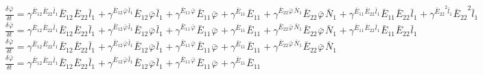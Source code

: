$\frac{{\delta}^{} {\bar{\varphi}}_{}}{{\delta} {{{t}}_{}}^{}} = {\gamma}^{{{{\bar{E}}_{12}}^{}{{\bar{E}}_{22}}^{}{{\bar{l}}_{1}}^{}}}{{{\bar{E}}_{12}}^{}{{\bar{E}}_{22}}^{}{{\bar{l}}_{1}}^{}} + {\gamma}^{{{{\bar{E}}_{12}}^{}{{\bar{\varphi}}_{}}^{}{{\bar{l}}_{1}}^{}}}{{{\bar{E}}_{12}}^{}{{\bar{\varphi}}_{}}^{}{{\bar{l}}_{1}}^{}} + {\gamma}^{{{{\bar{E}}_{11}}^{}{{\bar{\varphi}}_{}}^{}}}{{{\bar{E}}_{11}}^{}{{\bar{\varphi}}_{}}^{}} + {\gamma}^{{{{\bar{E}}_{11}}^{}}}{{{\bar{E}}_{11}}^{}} + {\gamma}^{{{{\bar{E}}_{22}}^{}{{\bar{\varphi}}_{}}^{}{{\bar{N}}_{1}}^{}}}{{{\bar{E}}_{22}}^{}{{\bar{\varphi}}_{}}^{}{{\bar{N}}_{1}}^{}} + {\gamma}^{{{{\bar{E}}_{11}}^{}{{\bar{E}}_{22}}^{}{{\bar{l}}_{1}}^{}}}{{{\bar{E}}_{11}}^{}{{\bar{E}}_{22}}^{}{{\bar{l}}_{1}}^{}} + {\gamma}^{{{{\bar{E}}_{22}}^{2}{{\bar{l}}_{1}}^{}}}{{{\bar{E}}_{22}}^{2}{{\bar{l}}_{1}}^{}}$
$\frac{{\delta}^{} {\bar{\varphi}}_{}}{{\delta} {{{t}}_{}}^{}} = {\gamma}^{{{{\bar{E}}_{12}}^{}{{\bar{E}}_{22}}^{}{{\bar{l}}_{1}}^{}}}{{{\bar{E}}_{12}}^{}{{\bar{E}}_{22}}^{}{{\bar{l}}_{1}}^{}} + {\gamma}^{{{{\bar{E}}_{12}}^{}{{\bar{\varphi}}_{}}^{}{{\bar{l}}_{1}}^{}}}{{{\bar{E}}_{12}}^{}{{\bar{\varphi}}_{}}^{}{{\bar{l}}_{1}}^{}} + {\gamma}^{{{{\bar{E}}_{11}}^{}{{\bar{\varphi}}_{}}^{}}}{{{\bar{E}}_{11}}^{}{{\bar{\varphi}}_{}}^{}} + {\gamma}^{{{{\bar{E}}_{11}}^{}}}{{{\bar{E}}_{11}}^{}} + {\gamma}^{{{{\bar{E}}_{22}}^{}{{\bar{\varphi}}_{}}^{}{{\bar{N}}_{1}}^{}}}{{{\bar{E}}_{22}}^{}{{\bar{\varphi}}_{}}^{}{{\bar{N}}_{1}}^{}} + {\gamma}^{{{{\bar{E}}_{11}}^{}{{\bar{E}}_{22}}^{}{{\bar{l}}_{1}}^{}}}{{{\bar{E}}_{11}}^{}{{\bar{E}}_{22}}^{}{{\bar{l}}_{1}}^{}}$
$\frac{{\delta}^{} {\bar{\varphi}}_{}}{{\delta} {{{t}}_{}}^{}} = {\gamma}^{{{{\bar{E}}_{12}}^{}{{\bar{E}}_{22}}^{}{{\bar{l}}_{1}}^{}}}{{{\bar{E}}_{12}}^{}{{\bar{E}}_{22}}^{}{{\bar{l}}_{1}}^{}} + {\gamma}^{{{{\bar{E}}_{12}}^{}{{\bar{\varphi}}_{}}^{}{{\bar{l}}_{1}}^{}}}{{{\bar{E}}_{12}}^{}{{\bar{\varphi}}_{}}^{}{{\bar{l}}_{1}}^{}} + {\gamma}^{{{{\bar{E}}_{11}}^{}{{\bar{\varphi}}_{}}^{}}}{{{\bar{E}}_{11}}^{}{{\bar{\varphi}}_{}}^{}} + {\gamma}^{{{{\bar{E}}_{11}}^{}}}{{{\bar{E}}_{11}}^{}} + {\gamma}^{{{{\bar{E}}_{22}}^{}{{\bar{\varphi}}_{}}^{}{{\bar{N}}_{1}}^{}}}{{{\bar{E}}_{22}}^{}{{\bar{\varphi}}_{}}^{}{{\bar{N}}_{1}}^{}}$
$\frac{{\delta}^{} {\bar{\varphi}}_{}}{{\delta} {{{t}}_{}}^{}} = {\gamma}^{{{{\bar{E}}_{12}}^{}{{\bar{E}}_{22}}^{}{{\bar{l}}_{1}}^{}}}{{{\bar{E}}_{12}}^{}{{\bar{E}}_{22}}^{}{{\bar{l}}_{1}}^{}} + {\gamma}^{{{{\bar{E}}_{12}}^{}{{\bar{\varphi}}_{}}^{}{{\bar{l}}_{1}}^{}}}{{{\bar{E}}_{12}}^{}{{\bar{\varphi}}_{}}^{}{{\bar{l}}_{1}}^{}} + {\gamma}^{{{{\bar{E}}_{11}}^{}{{\bar{\varphi}}_{}}^{}}}{{{\bar{E}}_{11}}^{}{{\bar{\varphi}}_{}}^{}} + {\gamma}^{{{{\bar{E}}_{11}}^{}}}{{{\bar{E}}_{11}}^{}}$
